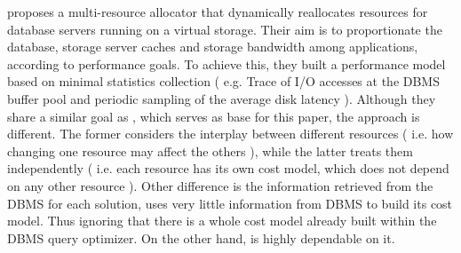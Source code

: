 \cite{Soundararajan:2009:DRA:1525908.1525914} proposes a multi-resource allocator that dynamically reallocates resources for database servers running on a virtual storage. Their aim is to proportionate the database, storage server caches and storage bandwidth among applications, according to performance goals. To achieve this, they built a performance model based on minimal statistics collection (  e.g. Trace of I/O accesses at the DBMS buffer pool and periodic sampling of the average disk latency ). Although they share a similar goal as  \cite{Soror:2008:AVM:1376616.1376711}, which serves as base for this paper, the approach is different. The former considers the interplay between different resources ( i.e. how changing one resource may affect the others ), while the latter treats them independently ( i.e. each resource has its own cost model, which does not depend on any other resource ). Other difference is the information retrieved from the DBMS for each solution, \cite{Soundararajan:2009:DRA:1525908.1525914} uses very little information from DBMS to build its cost model. Thus ignoring that there is a whole cost model already built within the DBMS query optimizer. On the other hand,\cite{Soror:2008:AVM:1376616.1376711} is highly dependable on it.